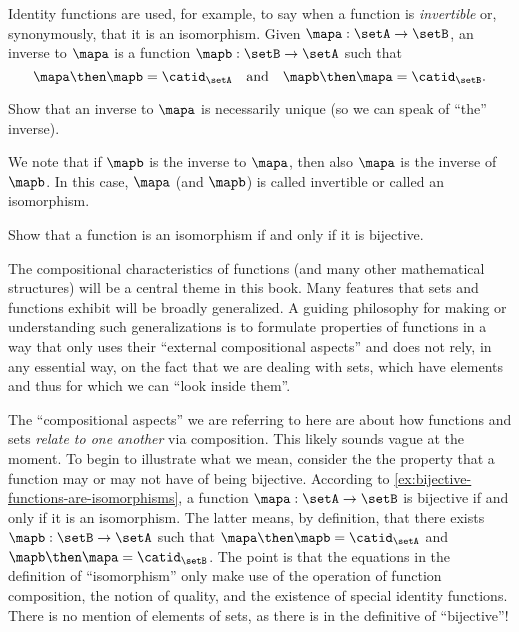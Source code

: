 Identity functions are used, for example, to say when a function is \emph{invertible} or, synonymously, that it is an isomorphism.  Given $\mapa : \setA \to \setB$, an inverse to $\mapa$ is a function $\mapb : \setB \to \setA$ such that 
\begin{equation}\label{eq:isomorphism-equations}
\mapa \then \mapb = \catid_\setA \quad \text{and}  \quad \mapb \then \mapa = \catid_\setB.
\end{equation}


\begin{exercise}
Show that an inverse to $\mapa$ is necessarily unique (so we can speak of ``the'' inverse). 
\end{exercise}

We note that if $\mapb$ is the inverse to $\mapa$, then also $\mapa$ is the inverse of $\mapb$. In this case, $\mapa$ (and $\mapb$) is called invertible or called an isomorphism. 

\begin{exercise}\label{ex:bijective-functions-are-isomorphisms}
Show that a function is an isomorphism if and only if it is bijective. 
\end{exercise}

The compositional characteristics of functions (and many other mathematical structures) will be a central theme in this book. Many features that sets and functions exhibit will be broadly generalized. A guiding philosophy for making or understanding such generalizations is to formulate properties of functions in a way that only uses their ``external compositional aspects'' and does not rely, in any essential way, on the fact that we are dealing with sets, which have elements and thus for which we can ``look inside them''. 

The ``compositional aspects'' we are referring to here are about how functions and sets \emph{relate to one another} via composition. This likely sounds vague at the moment. To begin to illustrate what we mean, consider the the property that a function may or may not have of being bijective. According to \cref{ex:bijective-functions-are-isomorphisms}, a function $\mapa: \setA \to \setB$ is bijective if and only if it is an isomorphism. The latter means, by definition, that there exists $\mapb : \setB \to \setA$ such that $\mapa \then \mapb = \catid_\setA$ and  $\mapb \then \mapa = \catid_\setB$. The point is that the equations in the definition of ``isomorphism'' only make use of the operation of function composition, the notion of quality, and the existence of special identity functions. There is no mention of elements of sets, as there is in the definitive of ``bijective''!

